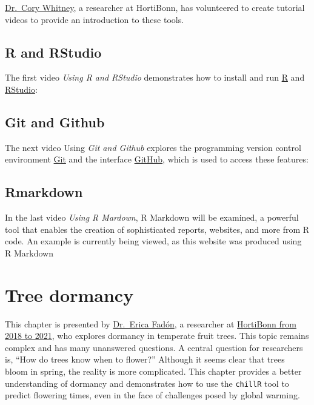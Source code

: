 \documentclass[
]{article}
\begin{document}
\href{https://inresgb-lehre.iaas.uni-bonn.de/author/dr.-cory-whitney/}{Dr.~Cory Whitney}, a researcher at HortiBonn, has volunteered to create tutorial videos to provide an introduction to these tools.

\subsection{R and RStudio}\label{r-and-rstudio}

The first video \emph{Using R and RStudio} demonstrates how to install and run \href{https://www.r-project.org/}{R} and \href{https://posit.co/download/rstudio-desktop/}{RStudio}:

\subsection{Git and Github}\label{git-and-github}

The next video Using \emph{Git and Github} explores the programming version control environment \href{https://git-scm.com/}{Git} and the interface \href{https://github.com/}{GitHub}, which is used to access these features:

\subsection{Rmarkdown}\label{rmarkdown}

In the last video \emph{Using R Mardown}, R Markdown will be examined, a powerful tool that enables the creation of sophisticated reports, websites, and more from R code. An example is currently being viewed, as this website was produced using R Markdown

\section{Tree dormancy}\label{tree-dormancy}

This chapter is presented by \href{https://scholar.google.de/citations?hl=de&user=MTmTnnsAAAAJ}{Dr.~Erica Fadón}, a researcher at \href{https://inresgb-lehre.iaas.uni-bonn.de/author/dr.-erica-fadon-adrian/}{HortiBonn from 2018 to 2021}, who explores dormancy in temperate fruit trees. This topic remains complex and has many unanswered questions. A central question for researchers is, ``How do trees know when to flower?'' Although it seems clear that trees bloom in spring, the reality is more complicated. This chapter provides a better understanding of dormancy and demonstrates how to use the \texttt{chillR} tool to predict flowering times, even in the face of challenges posed by global warming.
\end{document}

